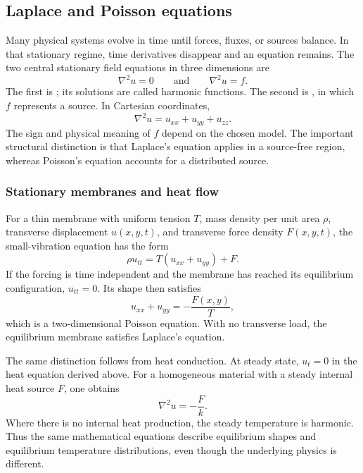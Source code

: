 \subsection{Laplace and Poisson equations}

Many physical systems evolve in time until forces, fluxes, or sources balance. In that stationary regime, time derivatives disappear and an  equation remains. The two central stationary field equations in three dimensions are
\begin{equation}
\nabla^2u=0
\qquad\text{and}\qquad
\nabla^2u=f.
\label{eq:ch04-laplace-poisson}
\end{equation}
The first is ; its solutions are called harmonic functions. The second is , in which $f$ represents a source. In Cartesian coordinates,
\begin{equation}
\nabla^2u=u_{xx}+u_{yy}+u_{zz}.
\end{equation}
The sign and physical meaning of $f$ depend on the chosen model. The important structural distinction is that Laplace's equation applies in a source-free region, whereas Poisson's equation accounts for a distributed source.

\subsubsection{Stationary membranes and heat flow}

For a thin membrane with uniform tension $T$, mass density per unit area $\rho$, transverse displacement $u(x,y,t)$, and transverse force density $F(x,y,t)$, the small-vibration equation has the form
\begin{equation}
\rho u_{tt}=T(u_{xx}+u_{yy})+F.
\end{equation}
If the forcing is time independent and the membrane has reached its equilibrium configuration, $u_{tt}=0$. Its shape then satisfies
\begin{equation}
u_{xx}+u_{yy}=-\frac{F(x,y)}{T},
\end{equation}
which is a two-dimensional Poisson equation. With no transverse load, the equilibrium membrane satisfies Laplace's equation.

The same distinction follows from heat conduction. At steady state, $u_t=0$ in the heat equation derived above. For a homogeneous material with a steady internal heat source $F$, one obtains
\begin{equation}
\nabla^2u=-\frac{F}{k}.
\end{equation}
Where there is no internal heat production, the steady temperature is harmonic. Thus the same mathematical equations describe equilibrium shapes and equilibrium temperature distributions, even though the underlying physics is different.

